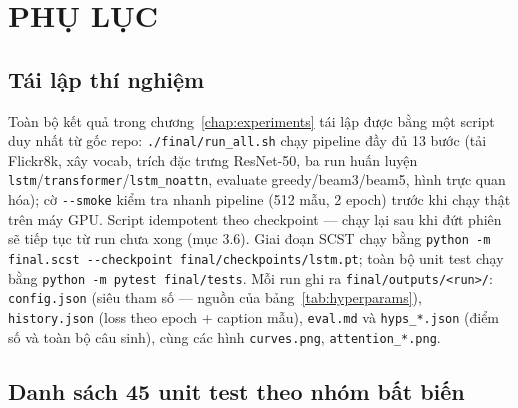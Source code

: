 \appendix
\chapter{PHỤ LỤC}
\label{app:appendix}

\section{Tái lập thí nghiệm}
\label{app:repro}

Toàn bộ kết quả trong chương~\ref{chap:experiments} tái lập được bằng một
script duy nhất từ gốc repo: \texttt{./final/run\_all.sh} chạy pipeline đầy đủ
13 bước (tải Flickr8k, xây vocab, trích đặc trưng ResNet-50, ba run huấn luyện
\texttt{lstm}/\texttt{transformer}/\texttt{lstm\_noattn}, evaluate
greedy/beam3/beam5, hình trực quan hóa); cờ \texttt{-{}-smoke} kiểm tra nhanh
pipeline (512 mẫu, 2 epoch) trước khi chạy thật trên máy GPU. Script idempotent
theo checkpoint --- chạy lại sau khi đứt phiên sẽ tiếp tục từ run chưa xong
(mục 3.6). Giai đoạn SCST chạy bằng \texttt{python -m final.scst
-{}-checkpoint final/checkpoints/lstm.pt}; toàn bộ unit test chạy bằng
\texttt{python -m pytest final/tests}. Mỗi run ghi ra
\texttt{final/outputs/<run>/}: \texttt{config.json} (siêu tham số --- nguồn của
bảng~\ref{tab:hyperparams}), \texttt{history.json} (loss theo epoch + caption
mẫu), \texttt{eval.md} và \texttt{hyps\_*.json} (điểm số và toàn bộ câu sinh),
cùng các hình \texttt{curves.png}, \texttt{attention\_*.png}.

\section{Danh sách 45 unit test theo nhóm bất biến}
\label{app:tests}

